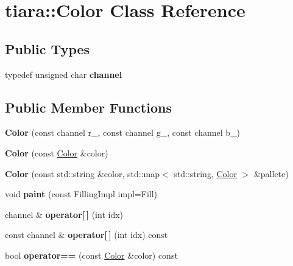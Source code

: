 \hypertarget{classtiara_1_1Color}{}\section{tiara\+::Color Class Reference}
\label{classtiara_1_1Color}
\subsection*{Public Types}
\begin{DoxyCompactItemize}
\item 
\mbox{\label{classtiara_1_1Color_a3fd08f0117d271896edd883332c3a833}} 
typedef unsigned char {\bfseries channel}
\end{DoxyCompactItemize}
\subsection*{Public Member Functions}
\begin{DoxyCompactItemize}
\item 
\mbox{\label{classtiara_1_1Color_a1b0ade8a4021addb72e5a7f100435a39}} 
{\bfseries Color} (const channel r\+\_, const channel g\+\_, const channel b\+\_)
\item 
\mbox{\label{classtiara_1_1Color_a91a51440d9bda5958f2820950667708d}} 
{\bfseries Color} (const \mbox{\hyperlink{classtiara_1_1Color}{Color}} \&color)
\item 
\mbox{\label{classtiara_1_1Color_add30f88a3494b55e5f5cbec18f9f2e52}} 
{\bfseries Color} (const std\+::string \&color, std\+::map$<$ std\+::string, \mbox{\hyperlink{classtiara_1_1Color}{Color}} $>$ \&pallete)
\item 
\mbox{\label{classtiara_1_1Color_aae22697dc2739d7211ffb4b89da159d5}} 
void {\bfseries paint} (const Filling\+Impl impl=Fill)
\item 
\mbox{\label{classtiara_1_1Color_aae9ea3e120a836090d21672e5fab6067}} 
channel \& {\bfseries operator\mbox{[}$\,$\mbox{]}} (int idx)
\item 
\mbox{\label{classtiara_1_1Color_a697f32cbb0fca23ed6ce8570d2cca0ae}} 
const channel \& {\bfseries operator\mbox{[}$\,$\mbox{]}} (int idx) const
\item 
\mbox{\label{classtiara_1_1Color_aeb3dc8b04527117fa7e21e5dd2a6f672}} 
bool {\bfseries operator==} (const \mbox{\hyperlink{classtiara_1_1Color}{Color}} \&color) const
\end{DoxyCompactItemize}
